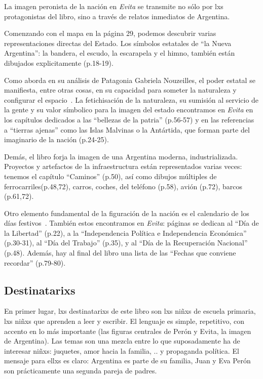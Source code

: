 La imagen peronista de la nación en \textit{Evita} se transmite no sólo por lxs protagonistas del libro, sino a través de relatos inmediatos de Argentina.

Comenzando con el mapa en la página 29, podemos descubrir varias representaciones directas del Estado.
Los símbolos estatales de ``la Nueva Argentina'': la bandera, el escudo, la escarapela y el himno, también están dibujados explicitamente (p.18-19).

Como aborda en su análisis de Patagonia Gabriela Nouzeilles, el poder estatal se manifiesta, entre otras cosas, en su capacidad para someter la naturaleza y configurar el espacio~\autocite{Nou1999}.
La fetichisación de la naturaleza, su sumisión al servicio de la gente y su valor símbolico para la imagen del estado encontramos en \textit{Evita} en los capítulos dedicados a las ``bellezas de la patria'' (p.56-57) y en las referencias a ``tierras ajenas'' como las Islas Malvinas o la Antártida, que forman parte del imaginario de la nación (p.24-25).

Demás, el libro forja la imagen de una Argentina moderna, industrializada.
Proyectos y artefactos de la infraestructura están representados varias veces:
tenemos el capítulo ``Caminos'' (p.50), así como dibujos múltiples de ferrocarriles(p.48,72), carros, coches, del teléfono (p.58), avión (p.72), barcos (p.61,72).

Otro elemento fundamental de la figuración de la nación es el calendario de los días festivos~\autocite{SzIr2009}.
También estos encontramos en \textit{Evita}:
páginas se dedican al
``Día de la Libertad'' (p.22),
a la ``Independencia Política e Independencia Económica'' (p.30-31),
al ``Día del Trabajo'' (p.35),
y al ``Día de la Recuperación Nacional'' (p.48).
Además, hay al final del libro una lista de las ``Fechas que conviene recordar'' (p.79-80).


\subsection{Destinatarixs}

En primer lugar, lxs destinatarixs de este libro son lxs niñxs de escuela primaria, lxs niñxs que aprenden a leer y escribir.
El lenguaje es simple, repetitivo, con accento en lo más importante (las figuras centrales de Perón y Evita, la imagen de Argentina).
Las temas son una mezcla entre lo que suposadamente ha de interesar niñxs: juquetes, amor hacia la familia, .. y propaganda política.
El mensaje para ellxs es claro: Argentina es parte de su familia, Juan y Eva Perón son prácticamente una segunda pareja de padres.

